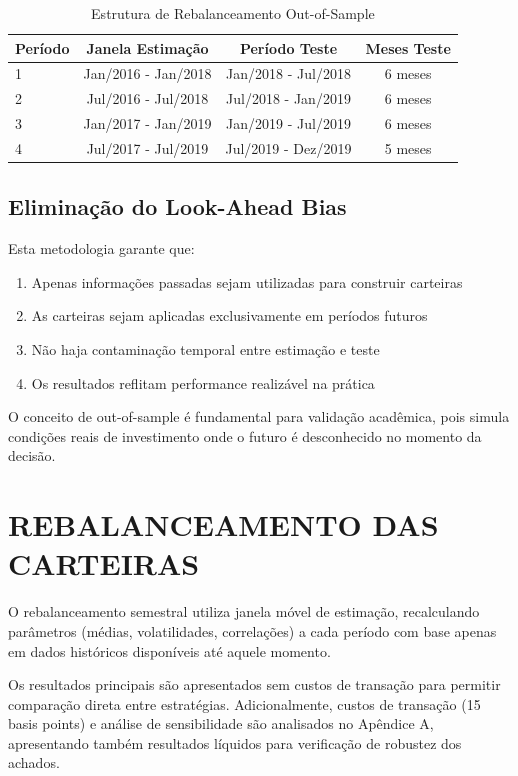 \begin{table}[H]
\centering
\caption{Estrutura de Rebalanceamento Out-of-Sample}
\begin{tabular}{lccc}
\toprule
\textbf{Período} & \textbf{Janela Estimação} & \textbf{Período Teste} & \textbf{Meses Teste} \\
\midrule
1 & Jan/2016 - Jan/2018 & Jan/2018 - Jul/2018 & 6 meses \\
2 & Jul/2016 - Jul/2018 & Jul/2018 - Jan/2019 & 6 meses \\
3 & Jan/2017 - Jan/2019 & Jan/2019 - Jul/2019 & 6 meses \\
4 & Jul/2017 - Jul/2019 & Jul/2019 - Dez/2019 & 5 meses \\
\bottomrule
\end{tabular}
\label{tab:rebalanceamento}
\end{table}

\subsection{Eliminação do Look-Ahead Bias}

Esta metodologia garante que:
\begin{enumerate}
    \item Apenas informações passadas sejam utilizadas para construir carteiras
    \item As carteiras sejam aplicadas exclusivamente em períodos futuros
    \item Não haja contaminação temporal entre estimação e teste
    \item Os resultados reflitam performance realizável na prática
\end{enumerate}

O conceito de out-of-sample é fundamental para validação acadêmica, pois simula condições reais de investimento onde o futuro é desconhecido no momento da decisão.

\section{REBALANCEAMENTO DAS CARTEIRAS}

O rebalanceamento semestral utiliza janela móvel de estimação, recalculando parâmetros (médias, volatilidades, correlações) a cada período com base apenas em dados históricos disponíveis até aquele momento.

Os resultados principais são apresentados sem custos de transação para permitir comparação direta entre estratégias. Adicionalmente, custos de transação (15 basis points) e análise de sensibilidade são analisados no Apêndice A, apresentando também resultados líquidos para verificação de robustez dos achados.

